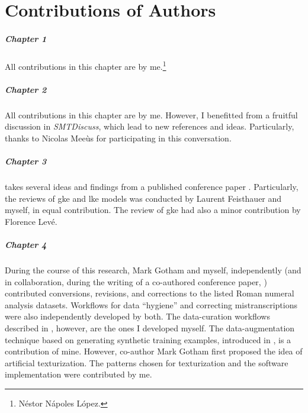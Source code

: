 \chapter*{Contributions of Authors}
\label{chap:contributionsofauthors}

\paragraph{Chapter 1}
All contributions in this chapter are by
me.\footnote{N\'estor N\'apoles L\'opez.}

\paragraph{Chapter 2}
All contributions in this chapter are by me. However, I
benefitted from a fruitful discussion in
\emph{SMTDiscuss},
which lead to new references and ideas. Particularly, thanks
to Nicolas Mee\`us for participating in this conversation.

\paragraph{Chapter 3} 
 takes several ideas and findings
from a published conference paper
\parencite{napoleslopez2020local}. Particularly, the reviews
of \gls{gke} and \gls{lke} models was conducted by Laurent
Feisthauer and myself, in equal contribution. The review of
\gls{gke} had also a minor contribution by Florence Lev\'e.

\paragraph{Chapter 4} 
During the course of this research, Mark Gotham and myself,
independently (and in collaboration, during the writing of a
co-authored conference paper,
\cite{napoleslopez2021augmentednet}) contributed
conversions, revisions, and corrections to the listed Roman
numeral analysis datasets. Workflows for data ``hygiene''
and correcting mistranscriptions were also independently
developed by both. The data-curation workflows described in
, however, are the ones
I developed myself. The data-augmentation technique based on
generating synthetic training examples, introduced in
, is a
contribution of mine. However, co-author Mark Gotham first
proposed the idea of artificial texturization. The patterns
chosen for texturization and the software implementation
were contributed by me.

